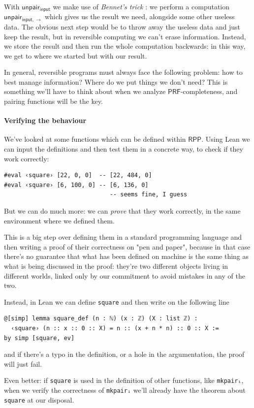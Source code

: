 \documentclass[oneside]{book}
\theoremstyle{definition}
\theoremstyle{remark}
\theoremstyle{plain}
\newcommand{\RPP}{\mathsf{RPP}}
\newcommand{\rppunpairi}{\mathsf{unpair_{input}}}
\newcommand{\rppunpairifwd}{\mathsf{unpair_{input, \rightarrow}}}
\newcommand{\PRF}{\mathsf{PRF}}
\begin{document}
With $\rppunpairi$ we make use of \textit{Bennet's trick} \cite{perumalla2013chc}:
we perform a computation $\rppunpairifwd$ which gives us the result we need, alongside some other useless data.
The obvious next step would be to throw away the useless data and just keep the result,
but in reversible computing we can't erase information.
Instead, we store the result and then run the whole computation backwards:
in this way, we get to where we started but with our result.

In general, reversible programs must always face the following problem: how to best manage information?
Where do we put things we don't need?
This is something we'll have to think about when we analyze $\PRF$-completeness,
and pairing functions will be the key.

\paragraph*{Verifying the behaviour}

We've looked at some functions which can be defined within $\RPP$.
Using Lean we can input the definitions and then test them in a concrete way,
to check if they work correctly:
\begin{lstlisting}
#eval ‹square› [22, 0, 0]  -- [22, 484, 0]
#eval ‹square› [6, 100, 0] -- [6, 136, 0]
                              -- seems fine, I guess
\end{lstlisting}
But we can do much more: we can \textit{prove} that they work correctly,
in the same environment where we defined them.

This is a big step over defining them in a standard programming language and then
writing a proof of their correctness on "pen and paper",
because in that case there's no guarantee that what has been defined on machine
is the same thing as what is being discussed in the proof:
they're two different objects living in different worlds,
linked only by our commitment to avoid mistakes in any of the two.

Instead, in Lean we can define \lstinline{square} and then write on the following line
\begin{lstlisting}
@[simp] lemma square_def (n : ℕ) (x : ℤ) (X : list ℤ) :
  ‹square› (n :: x :: 0 :: X) = n :: (x + n * n) :: 0 :: X :=
by simp [square, ev]
\end{lstlisting}
and if there's a typo in the definition, or a hole in the argumentation,
the proof will just fail.

Even better: if \lstinline{square} is used in the definition of other functions,
like \lstinline{mkpairᵢ}, when we verify the correctness of \lstinline{mkpairᵢ}
we'll already have the theorem about \lstinline{square} at our disposal.
\end{document}
